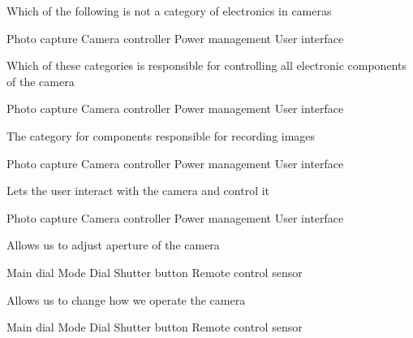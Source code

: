 \documentclass[theme=sleek, randomorder, hidesidemenu]{webquiz}
\begin{document}
\begin{question}
  Which of the following is not a category of electronics in cameras
  \begin{choice}[columns=2]
    \incorrect Photo capture
    \incorrect Camera controller
    \correct   Power management
    \incorrect User interface
  \end{choice}
\end{question}

\begin{question}
  Which of these categories is responsible for controlling all electronic components of the camera
  \begin{choice}[columns=2]
    \incorrect Photo capture
    \correct Camera controller
    \incorrect   Power management
    \incorrect User interface
  \end{choice}
\end{question}

\begin{question}
  The category for components responsible for recording images
  \begin{choice}[columns=2]
    \correct Photo capture
    \incorrect Camera controller
    \incorrect   Power management
    \incorrect User interface
  \end{choice}
\end{question}

\begin{question}
  Lets the user interact with the camera and control it
  \begin{choice}[columns=2]
    \incorrect Photo capture
    \incorrect Camera controller
    \incorrect   Power management
    \correct User interface
  \end{choice}
\end{question}

\begin{question}
  Allows us to adjust aperture of the camera
  \begin{choice}[columns=2]
    \correct Main dial
    \incorrect Mode Dial
    \incorrect Shutter button
    \incorrect Remote control sensor
  \end{choice}
\end{question}

\begin{question}
  Allows us to change how we operate the camera
  \begin{choice}[columns=2]
    \incorrect Main dial
    \correct Mode Dial
    \incorrect Shutter button
    \incorrect Remote control sensor
  \end{choice}
\end{question}
\end{document}
